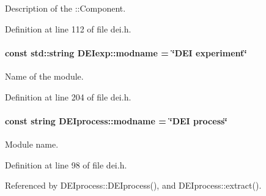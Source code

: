 Description of the ::Component. 



Definition at line 112 of file dei.h.

\hypertarget{group__deiedei_ga8e2f6229a9aeb4e72e58ba3af8efe3d8}{
\paragraph[{modname}]{\setlength{\rightskip}{0pt plus 5cm}const std::string {\bf DEIexp::modname} = \char`\"{}DEI experiment\char`\"{}}\hfill}
\label{group__deiedei_ga8e2f6229a9aeb4e72e58ba3af8efe3d8}


Name of the module. 



Definition at line 204 of file dei.h.

\hypertarget{group__deiedei_ga4d52136a225c01de8f1892b762bf2024}{
\paragraph[{modname}]{\setlength{\rightskip}{0pt plus 5cm}const string {\bf DEIprocess::modname} = \char`\"{}DEI process\char`\"{}}\hfill}
\label{group__deiedei_ga4d52136a225c01de8f1892b762bf2024}


Module name. 



Definition at line 98 of file dei.h.



Referenced by DEIprocess::DEIprocess(), and DEIprocess::extract().

